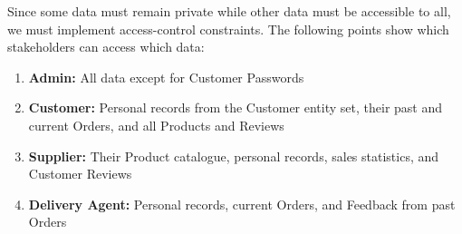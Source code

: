 \documentclass[12pt]{report}
\begin{document}
    Since some data must remain private while other data must be accessible to all, we must implement access-control constraints.
    The following points show which stakeholders can access which data:
    \begin{enumerate}
        \item \textbf{Admin:} All data except for Customer Passwords
        \item \textbf{Customer:} Personal records from the Customer entity set, their past and current Orders, and all Products and Reviews
        \item \textbf{Supplier:} Their Product catalogue, personal records, sales statistics, and Customer Reviews
        \item \textbf{Delivery Agent:} Personal records, current Orders, and Feedback from past Orders
    \end{enumerate}
\end{document}
